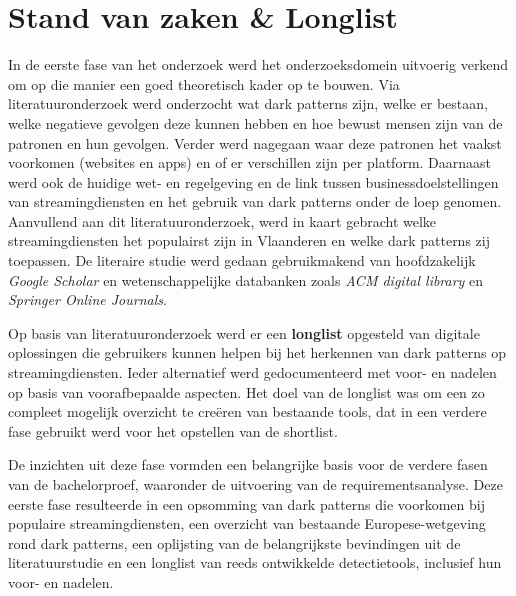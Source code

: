 \vspace{1em}

\section{Stand van zaken \& Longlist}
\label{sec:stand-van-zaken-en-longlist}

\vspace{1em}

In de eerste fase van het onderzoek werd het onderzoeksdomein uitvoerig verkend om op die manier een goed theoretisch kader op te bouwen. Via literatuuronderzoek werd onderzocht wat dark patterns zijn, welke er bestaan, welke negatieve gevolgen deze kunnen hebben en hoe bewust mensen zijn van de patronen en hun gevolgen. Verder werd nagegaan waar deze patronen het vaakst voorkomen (websites en apps) en of er verschillen zijn per platform. Daarnaast werd ook de huidige wet- en regelgeving en de link tussen businessdoelstellingen van streamingdiensten en het gebruik van dark patterns onder de loep genomen. Aanvullend aan dit literatuuronderzoek, werd in kaart gebracht welke streamingdiensten het populairst zijn in Vlaanderen en welke dark patterns zij toepassen. De literaire studie werd gedaan gebruikmakend van hoofdzakelijk \emph{Google Scholar} en wetenschappelijke databanken zoals \emph{ACM digital library} en \emph{Springer Online Journals}.

\vspace{1em}

Op basis van literatuuronderzoek werd er een \textbf{longlist} opgesteld van digitale oplossingen die gebruikers kunnen helpen bij het herkennen van dark patterns op streamingdiensten. Ieder alternatief werd gedocumenteerd met voor- en nadelen op basis van voorafbepaalde aspecten. Het doel van de longlist was om een zo compleet mogelijk overzicht te creëren van bestaande tools, dat in een verdere fase gebruikt werd voor het opstellen van de shortlist. 

\vspace{1em}

De inzichten uit deze fase vormden een belangrijke basis voor de verdere fasen van de bachelorproef, waaronder de uitvoering van de requirementsanalyse.
Deze eerste fase resulteerde in een opsomming van dark patterns die voorkomen bij populaire streamingdiensten, een overzicht van bestaande Europese-wetgeving rond dark patterns, een oplijsting van de belangrijkste bevindingen uit de literatuurstudie en een longlist van reeds ontwikkelde detectietools, inclusief hun voor- en nadelen.

